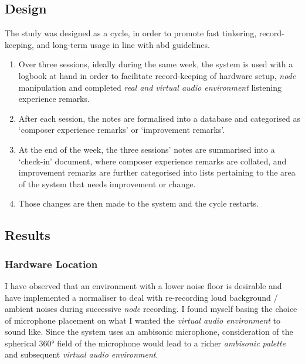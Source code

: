 \subsection{Design}\label{sec: area-study-design}
The study was designed as a cycle, in order to promote fast tinkering, record-keeping, and long-term usage in line with \gls{abd} guidelines. 
\begin{enumerate}
    \item Over three sessions, ideally during the same week, the system is used with a logbook at hand in order to facilitate record-keeping of hardware setup, \textit{node} manipulation and completed \textit{real and virtual audio environment} listening experience remarks.
    \item After each session, the notes are formalised into a database and categorised as `composer experience remarks' or `improvement remarks'.
    \item At the end of the week, the three sessions' notes are summarised into a `check-in' document, where composer experience remarks are collated, and improvement remarks are further categorised into lists pertaining to the area of the system that needs improvement or change.
    \item Those changes are then made to the system and the cycle restarts.
\end{enumerate}

\subsection{Results}\label{sec: area-study-results}
\subsubsection{Hardware Location}\label{sec: area-study-results-hwloc}
I have observed that an environment with a lower noise floor is desirable and have implemented a normaliser to deal with re-recording loud background / ambient noises during successive \textit{node} recording. I found myself basing the choice of microphone placement on what I wanted the \textit{virtual audio environment} to sound like. Since the system uses an ambisonic microphone, consideration of the spherical 360° field of the microphone would lead to a richer \textit{ambisonic palette} and subsequent \textit{virtual audio environment}.

